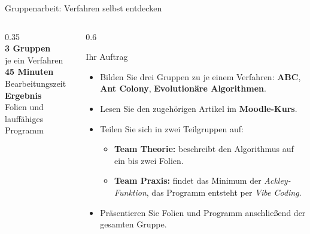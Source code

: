 \begin{frame}{Gruppenarbeit: Verfahren selbst entdecken}
\vspace{0.5em}
\begin{columns}
\begin{column}{0.35\textwidth}
\centering
{}\\[1em]
\footnotesize
\textbf{3 Gruppen}\\
je ein Verfahren\\[0.5em]
\textbf{45 Minuten}\\
Bearbeitungszeit\\[0.5em]
\textbf{Ergebnis}\\
Folien und lauffähiges Programm
\end{column}
\begin{column}{0.6\textwidth}
\footnotesize
\begin{block}{\footnotesize Ihr Auftrag}
\begin{itemize}
  \item Bilden Sie drei Gruppen zu je einem Verfahren: \textbf{ABC}, \textbf{Ant Colony}, \textbf{Evolutionäre Algorithmen}.
  \item Lesen Sie den zugehörigen Artikel im \textbf{Moodle-Kurs}.
  \item Teilen Sie sich in zwei Teilgruppen auf:
  \begin{itemize}
    \footnotesize
    \item \textbf{Team Theorie:} beschreibt den Algorithmus auf ein bis zwei Folien.
    \item \textbf{Team Praxis:} findet das Minimum der \emph{Ackley-Funktion}, das Programm entsteht per \emph{Vibe Coding}.
  \end{itemize}
  \item Präsentieren Sie Folien und Programm anschließend der gesamten Gruppe.
\end{itemize}
\end{block}
\end{column}
\end{columns}
\end{frame}

\makequizpage{\QUIZURL}{\QUIZQRCODE}{\QUIZIMAGE}
\makequestionspage{\FRAGENIMAGE}
